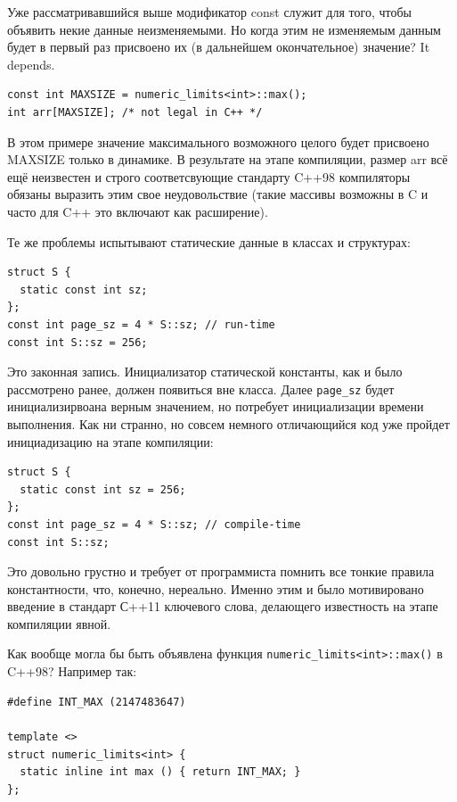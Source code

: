 \documentclass[a4paper,12pt,oneside]{article}
\begin{document}
Уже рассматривавшийся выше модификатор const служит для того, чтобы объявить некие данные неизменяемыми. Но когда этим не изменяемым данным будет в первый раз присвоено их (в дальнейшем окончательное) значение? It depends.

\begin{lstlisting}
const int MAXSIZE = numeric_limits<int>::max();
int arr[MAXSIZE]; /* not legal in C++ */
\end{lstlisting}

В этом примере значение максимального возможного целого будет присвоено MAXSIZE только в динамике. В результате на этапе компиляции, размер arr всё ещё неизвестен и строго соответсвующие стандарту C++98 компиляторы обязаны выразить этим свое неудовольствие (такие массивы возможны в C и часто для C++ это включают как расширение).

Те же проблемы испытывают статические данные в классах и структурах:

\begin{lstlisting}
struct S {
  static const int sz;
};
const int page_sz = 4 * S::sz; // run-time
const int S::sz = 256; 
\end{lstlisting}

Это законная запись. Инициализатор статической константы, как и было рассмотрено ранее, должен появиться вне класса. Далее \lstinline!page_sz! будет инициализирвоана верным значением, но потребует инициализации времени выполнения. Как ни странно, но совсем немного отличающийся код уже пройдет инициадизацию на этапе компиляции:

\begin{lstlisting}
struct S {
  static const int sz = 256;
};
const int page_sz = 4 * S::sz; // compile-time
const int S::sz;
\end{lstlisting}

Это довольно грустно и требует от программиста помнить все тонкие правила константности, что, конечно, нереально. Именно этим и было мотивировано введение в стандарт С++11 ключевого слова, делающего известность на этапе компиляции явной.

Как вообще могла бы быть объявлена функция \lstinline!numeric_limits<int>::max()! в C++98? Например так:

\begin{lstlisting}
#define INT_MAX (2147483647)

template <>
struct numeric_limits<int> {
  static inline int max () { return INT_MAX; }
};
\end{lstlisting}
\end{document}
